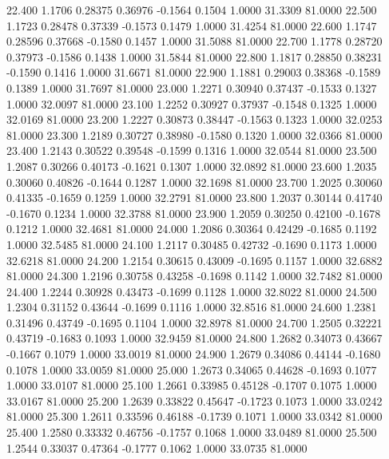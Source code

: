   22.400   1.1706   0.28375   0.36976  -0.1564   0.1504   1.0000  31.3309  81.0000
  22.500   1.1723   0.28478   0.37339  -0.1573   0.1479   1.0000  31.4254  81.0000
  22.600   1.1747   0.28596   0.37668  -0.1580   0.1457   1.0000  31.5088  81.0000
  22.700   1.1778   0.28720   0.37973  -0.1586   0.1438   1.0000  31.5844  81.0000
  22.800   1.1817   0.28850   0.38231  -0.1590   0.1416   1.0000  31.6671  81.0000
  22.900   1.1881   0.29003   0.38368  -0.1589   0.1389   1.0000  31.7697  81.0000
  23.000   1.2271   0.30940   0.37437  -0.1533   0.1327   1.0000  32.0097  81.0000
  23.100   1.2252   0.30927   0.37937  -0.1548   0.1325   1.0000  32.0169  81.0000
  23.200   1.2227   0.30873   0.38447  -0.1563   0.1323   1.0000  32.0253  81.0000
  23.300   1.2189   0.30727   0.38980  -0.1580   0.1320   1.0000  32.0366  81.0000
  23.400   1.2143   0.30522   0.39548  -0.1599   0.1316   1.0000  32.0544  81.0000
  23.500   1.2087   0.30266   0.40173  -0.1621   0.1307   1.0000  32.0892  81.0000
  23.600   1.2035   0.30060   0.40826  -0.1644   0.1287   1.0000  32.1698  81.0000
  23.700   1.2025   0.30060   0.41335  -0.1659   0.1259   1.0000  32.2791  81.0000
  23.800   1.2037   0.30144   0.41740  -0.1670   0.1234   1.0000  32.3788  81.0000
  23.900   1.2059   0.30250   0.42100  -0.1678   0.1212   1.0000  32.4681  81.0000
  24.000   1.2086   0.30364   0.42429  -0.1685   0.1192   1.0000  32.5485  81.0000
  24.100   1.2117   0.30485   0.42732  -0.1690   0.1173   1.0000  32.6218  81.0000
  24.200   1.2154   0.30615   0.43009  -0.1695   0.1157   1.0000  32.6882  81.0000
  24.300   1.2196   0.30758   0.43258  -0.1698   0.1142   1.0000  32.7482  81.0000
  24.400   1.2244   0.30928   0.43473  -0.1699   0.1128   1.0000  32.8022  81.0000
  24.500   1.2304   0.31152   0.43644  -0.1699   0.1116   1.0000  32.8516  81.0000
  24.600   1.2381   0.31496   0.43749  -0.1695   0.1104   1.0000  32.8978  81.0000
  24.700   1.2505   0.32221   0.43719  -0.1683   0.1093   1.0000  32.9459  81.0000
  24.800   1.2682   0.34073   0.43667  -0.1667   0.1079   1.0000  33.0019  81.0000
  24.900   1.2679   0.34086   0.44144  -0.1680   0.1078   1.0000  33.0059  81.0000
  25.000   1.2673   0.34065   0.44628  -0.1693   0.1077   1.0000  33.0107  81.0000
  25.100   1.2661   0.33985   0.45128  -0.1707   0.1075   1.0000  33.0167  81.0000
  25.200   1.2639   0.33822   0.45647  -0.1723   0.1073   1.0000  33.0242  81.0000
  25.300   1.2611   0.33596   0.46188  -0.1739   0.1071   1.0000  33.0342  81.0000
  25.400   1.2580   0.33332   0.46756  -0.1757   0.1068   1.0000  33.0489  81.0000
  25.500   1.2544   0.33037   0.47364  -0.1777   0.1062   1.0000  33.0735  81.0000
